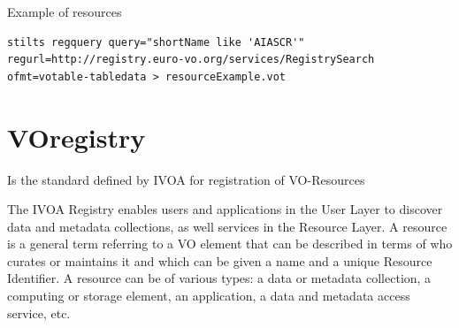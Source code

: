Example of resources

\begin{lstlisting}[frame=single]
stilts regquery query="shortName like 'AIASCR'"
regurl=http://registry.euro-vo.org/services/RegistrySearch
ofmt=votable-tabledata > resourceExample.vot
\end{lstlisting}

  



    
\section{VOregistry}
    Is the standard defined by IVOA for registration of VO-Resources

    The IVOA Registry enables users and applications in the User Layer to discover 
    data  and  metadata  collections,  as  well  services  in  the  Resource  Layer.  A 
    resource  is  a  general  term  referring  to  a  VO  element  that  can  be  described  in 
    terms  of  who  curates  or  maintains  it  and  which  can  be  given  a  name  and  a 
    unique  Resource  Identifier.  A  resource  can  be  of  various  types:  a  data  or 
    metadata collection, a computing or storage element, an application, a data and 
    metadata access service, etc. \cite{gray2007}
    

